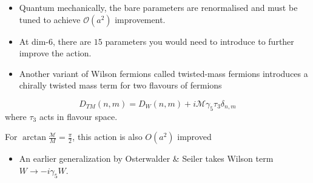 \begin{itemize}
  \item Quantum mechanically, the bare parameters are renormalised and must be tuned to achieve \(\mathcal{O}\left(a^{2}\right)\) improvement. 
  \item At dim-$6$, there are $15$ parameters you would need to introduce to further improve the action.
  \item Another  variant of Wilson fermions called twisted-mass fermions introduces a chirally twisted mass term for two flavours of fermions
\end{itemize}

\begin{equation}
D_{T M}(n, m)=D_{W}(n, m)+i \mathcal{M}\gamma_{5} \tau_{3} \delta_{n, m}
\end{equation}
where $\tau_3$ acts in flavour space.

For \(\arctan \frac{\mathcal{M}}{M}=\frac{\pi}{2}\), this action is also \(O\left(a^{2}\right)\) improved

\begin{itemize}
    \item An earlier generalization by Osterwalder \& Seiler takes Wilson term $W \rightarrow -i \gamma_5 W$.
\end{itemize}
